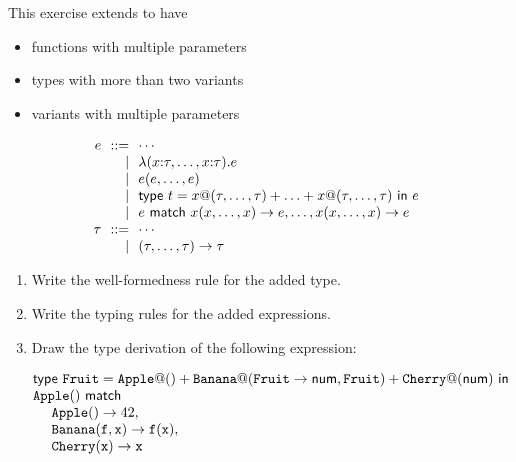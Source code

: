 \begin{exercise}

This exercise extends \lang to have
  \begin{itemize}
      \item functions with multiple parameters
      \item types with more than two variants
      \item variants with multiple parameters
  \end{itemize}
\[
  \begin{array}{@{}r@{~~}r@{~~}l}
    e & ::= & \cdots \\
    &|& \efun{(x{:}\tau,\ldots,x{:}\tau)}{e} \\
    &|& e(e,\ldots,e) \\
    &|& \textsf{type}\ t=x@(\tau,\ldots,\tau)+\ldots+x@(\tau,\ldots,\tau)\ \textsf{in}\ e \\
    &|& e\ \textsf{match}\ x(x,\ldots,x)\rightarrow e,\ldots,x(x,\ldots,x)\rightarrow e \\
    \tau & ::= & \cdots \\
    &|& \tarrow{(\tau,\ldots,\tau)}{\tau}
  \end{array}
\]

\begin{enumerate}
  \item Write the well-formedness rule for the added type.
  \item Write the typing rules for the added expressions.
  \item Draw the type derivation of the following expression:

    $
    \begin{array}{@{}l}
      \textsf{type}\ \code{Fruit}=
      \code{Apple}@()+
      \code{Banana}@(\tarrow{\code{Fruit}}{\tnum},\code{Fruit})+
      \code{Cherry}@(\tnum)\ \textsf{in} \\
      \code{Apple}()\ \textsf{match} \\
      \ \ \ \ \code{Apple}()\rightarrow 42,\\
      \ \ \ \ \code{Banana}(\cf,\cx)\rightarrow \cf(\cx),\\
      \ \ \ \ \code{Cherry}(\cx)\rightarrow \cx
    \end{array}
    $
\end{enumerate}

\end{exercise}
